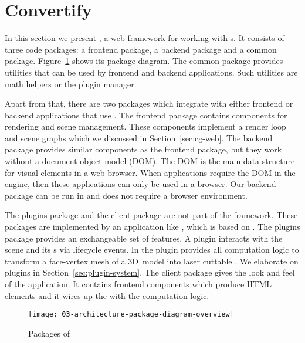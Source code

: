 \documentclass[../../ClassicThesis.tex]{subfiles}
\begin{document}

\section{Convertify}
\label{sec:framework-convertify}

In this section we present {\convertify}, a web framework
for working with {\threedmodel}s. It consists of three code
packages: a frontend package, a backend package and a common
package. Figure~\ref{fig:platener-package-diagram-overview}
shows its package diagram. The common package provides
utilities that can be used by frontend and backend
applications. Such utilities are math helpers or the plugin
manager.

Apart from that, there are two packages which
integrate with either frontend or backend applications that
use {\convertify}. The frontend package contains components
for rendering and scene management. These components
implement a render loop and scene graphs which we discussed
in Section~\ref{sec:cg-web}. The backend package provides
similar components as the frontend package, but they work
without a document object model (DOM). The DOM is the main
data structure for visual elements in a web browser. When
applications require the DOM in the {\javascript} engine,
then these applications can only be used in a browser. Our
backend package can be run in {\nodejs} and does not require a
browser environment.

The plugins package and the client package are not part of
the {\convertify} framework. These packages are implemented
by an application like {\platener}, which is based on
{\convertify}. The plugins package provides an exchangeable
set of features. A plugin interacts with the scene and its
{\threedmodel}s via lifecycle events. In {\platener} the
 plugin provides all computation
logic to transform a face-vertex mesh of a 3D~model into
laser cuttable {\svgfile}. We elaborate on plugins in
Section~\ref{sec:plugin-system}. The client package gives
the look and feel of the application. It contains frontend
components which produce HTML elements and it wires up the
{\userinterface} with the computation logic.

\begin{figure}[h]
  \centering
  \texttt{[image: 03-architecture-package-diagram-overview]}
  \caption{Packages of {\convertify}}
  \label{fig:platener-package-diagram-overview}
\end{figure}
\end{document}
